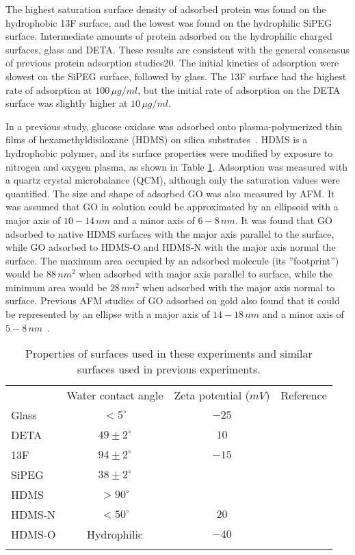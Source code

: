 The highest saturation surface density of adsorbed protein was found
on the hydrophobic 13F surface, and the lowest was found on the hydrophilic
SiPEG surface. Intermediate amounts of protein adsorbed on the hydrophilic
charged surfaces, glass and DETA. These results are consistent with
the general consensus of previous protein adsorption studies20. The
initial kinetics of adsorption were slowest on the SiPEG surface,
followed by glass. The 13F surface had the highest rate of adsorption
at $100\,\mu g/ml$, but the initial rate of adsorption on the DETA
surface was slightly higher at $10\,\mu g/ml$.

In a previous study, glucose oxidase was adsorbed onto plasma-polymerized
thin films of hexamethyldisiloxane (HDMS) on silica substrates~\cite{Muguruma2006}.
HDMS is a hydrophobic polymer, and its surface properties were modified
by exposure to nitrogen and oxygen plasma, as shown in Table \ref{tab:Surface Properties}.
Adsorption was measured with a quartz crystal microbalance (QCM),
although only the saturation values were quantified. The size and
shape of adsorbed GO was also measured by AFM. It was assumed that
GO in solution could be approximated by an ellipsoid with a major
axis of $10-14\, nm$ and a minor axis of $6-8\, nm$. It was found
that GO adsorbed to native HDMS surfaces with the major axis parallel
to the surface, while GO adsorbed to HDMS-O and HDMS-N with the major
axis normal the surface. The maximum area occupied by an adsorbed
molecule (its ''footprint'') would be $88\, nm^{2}$ when adsorbed
with major axis parallel to surface, while the minimum area would
be $28\, nm^{2}$ when adsorbed with the major axis normal to surface.
Previous AFM studies of GO adsorbed on gold also found that it could
be represented by an ellipse with a major axis of $14-18\, nm$ and
a minor axis of $5-8\, nm$~\cite{Quinto1998}.%
\begin{table}
\caption{\label{tab:Surface Properties}Properties of surfaces used in these
experiments and similar surfaces used in previous experiments.}
\begin{tabular}{lccc}
 & Water contact angle & Zeta potential ($mV$) & Reference\tabularnewline[\doublerulesep]
\cline{2-4} 
\noalign{\vskip\doublerulesep}
Glass & $<5^{\circ}$ & $-25$ & \cite{Kirby2004,Wilson2011a}\tabularnewline
\noalign{\vskip\doublerulesep}
DETA & $49\pm2^{\circ}$ & $10$ & \cite{Wilson2011a,Metwalli2006}\tabularnewline
\noalign{\vskip\doublerulesep}
13F & $94\pm2^{\circ}$ & $-15$ & \cite{Stenger1992,Tandon2008}\tabularnewline
\noalign{\vskip\doublerulesep}
SiPEG & $38\pm2^{\circ}$ &  & \cite{Wilson2011a}\tabularnewline
\noalign{\vskip\doublerulesep}
HDMS & $>90^{\circ}$ &  & \cite{Muguruma2006}\tabularnewline
\noalign{\vskip\doublerulesep}
HDMS-N & $<50^{\circ}$ & $20$ & \cite{Muguruma2006}\tabularnewline
\noalign{\vskip\doublerulesep}
HDMS-O & Hydrophilic & $-40$ & \cite{Muguruma2006}\tabularnewline
\noalign{\vskip\doublerulesep}
\end{tabular}%
\end{table}



